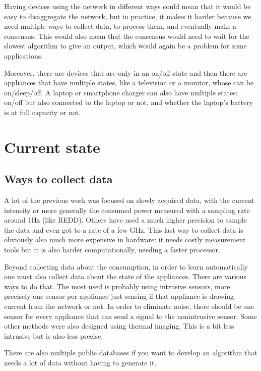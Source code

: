 Having devices using the network in different ways could mean that it would be easy to disaggregate the network, but in practice, it makes it harder because we need multiple ways to collect data, to process them, and eventually make a consensus. This would also mean that the consensus would need to wait for the slowest algorithm to give an output, which would again be a problem for some applications.

Moreover, there are devices that are only in an on/off state and then there are appliances that have multiple states, like a television or a monitor, whose can be on/sleep/off. A laptop or smartphone charger can also have multiple states: on/off but also connected to the laptop or not, and whether the laptop's battery is at full capacity or not.

\section{Current state}
\subsection{Ways to collect data}
A lot of the previous work was focused on slowly acquired data, with the current intensity or more generally the consumed power measured with a sampling rate around 1Hz (like REDD\cite{kolter2011redd}). Others have used a much higher precision to sample the data and even got to a rate of a few GHz\cite{gupta2010electrisense}. This last way to collect data is obviously also much more expensive in hardware: it needs costly measurement tools but it is also harder computationally, needing a faster processor.

Beyond collecting data about the consumption, in order to learn automatically one must also collect data about the state of the appliances. There are various ways to do that. The most used is probably using intrusive sensors, more precisely one sensor per appliance just sensing if that appliance is drawing current from the network or not. In order to eliminate noise, there should be one sensor for every appliance that can send a signal to the nonintrusive sensor.
Some other methods were also designed using thermal imaging\cite{ho2011heatprobe}. This is a bit less intrusive but is also less precise.

There are also multiple public databases if you want to develop an algorithm that needs a lot of data without having to generate it.%




